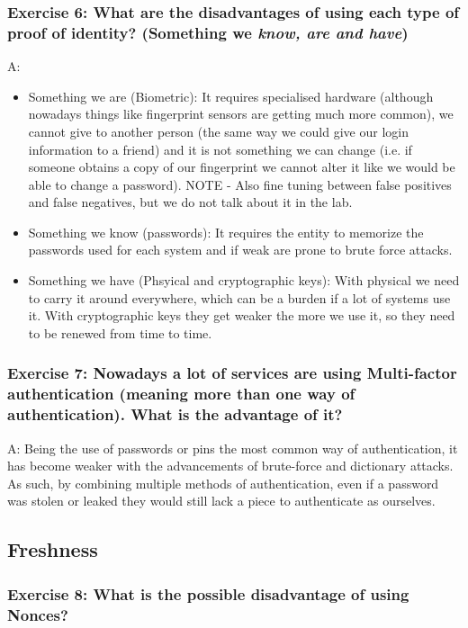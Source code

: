 \documentclass[12pt,a4paper]{article}
\begin{document}
\subsubsection*{Exercise 6: What are the disadvantages of using each type of proof of identity? (Something we \emph{know, are and have})}

A: 
\begin{itemize}
    \item Something we are (Biometric): It requires specialised hardware (although nowadays things like fingerprint sensors are getting much more common), we cannot give to another person (the same way we could give our login information to a friend) and it is not something we can change (i.e. if someone obtains a copy of our fingerprint we cannot alter it like we would be able to change a password). NOTE - Also fine tuning between false positives and false negatives, but we do not talk about it in the lab.
    \item Something we know (passwords): It requires the entity to memorize the passwords used for each system and if weak are prone to brute force attacks.
    \item Something we have (Phsyical and cryptographic keys): With physical we need to carry it around everywhere, which can be a burden if a lot of systems use it. With cryptographic keys they get weaker the more we use it, so they need to be renewed from time to time.
\end{itemize}

\subsubsection*{Exercise 7: Nowadays a lot of services are using Multi-factor authentication (meaning more than one way of authentication). What is the advantage of it?}

A: Being the use of passwords or pins the most common way of authentication, it has become weaker with the advancements of brute-force and dictionary attacks. As such, by combining multiple methods of authentication, even if a password was stolen or leaked they would still lack a piece to authenticate as ourselves.

\subsection*{Freshness}
\subsubsection*{Exercise 8: What is the possible disadvantage of using Nonces?}
\end{document}
